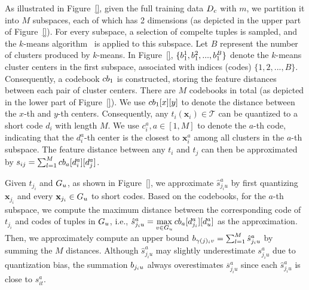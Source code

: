 
As illustrated in Figure~\ref{}, given the full training data $D_c$ with $m$, we partition it into $M$ subspaces, each of which has 2 dimensions (as depicted in the upper part of Figure~\ref{}). For every subspace, a selection of compelte tuples is sampled, and the $k$-means algorithm~\cite{} is applied to this subspace. Let $B$ represent the number of clusters produced by $k$-means. In Figure~\ref{}, $\{b_1^1, b_1^2,..., b_1^B\}$ denote the $k$-means cluster centers in the first subspace, associated with indices (codes) $\{1, 2,...,B\}$. Consequently, a codebook $cb_1$ is constructed, storing the feature distances between each pair of cluster centers. There are $M$ codebooks in total (as depicted in the lower part of Figure~\ref{}). We use $cb_1[x][y]$ to denote the distance between the $x$-th and $y$-th centers. Consequently, any $t_i (\mathbf{x}_i) \in \mathcal{T}$ can be quantized to a short code $d_i$ with length $M$. We use $c_i^a, a\in[1,M]$ to denote the $a$-th code, indicating that the $d_i^a$-th center is the closest to $\mathbf{x}_i^a$ among all clusters in the $a$-th subspace. The feature distance between any $t_i$ and $t_j$ can then be approximated by $s_{ij}=\sum_{l=1}^{M}cb_a[d_i^a][d_j^a]$.

Given $t_{j_i}$ and $G_u$, as shown in Figure~\ref{}, we approximate $\hat{s}_{j_iu}^a$ by first quantizing $\mathbf{x}_{j_i}$ and every $\mathbf{x}_{j_i} \in G_u$ to short codes. Based on the codebooks, for the $a$-th subspace, we compute the maximum distance between the corresponding code of $t_{j_i}$ and codes of tuples in $G_u$, i.e., $\hat{s}_{j_iu}^a = \max\limits_{v\in G_u}cb_a[d_{j_i}^a][d_u^a]$ as the approximation. Then, we approximately compute an upper bound $b_{\gamma(j)_iv}=\sum_{l=1}^{M}\hat{s}_{j_iu}^a$ by summing the $M$ distances. Although $\hat{s}_{j_iu}^a$ may slightly underestimate $s^a_{j_iu}$ due to quantization bias, the summation $b_{j_iu}$ always overestimates $\overline{s}^a_{j_iu}$ since each $\hat{s}_{j_iu}^a$ is close to $s^a_{it}$.
